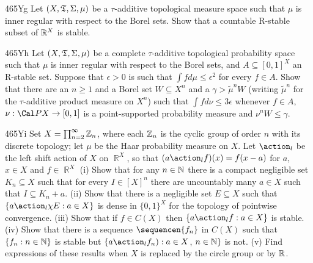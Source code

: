 {\spheader 465Yg Let $(X,\frak T,\Sigma,\mu)$ be a $\tau$-additive
topological measure space such that $\mu$ is inner regular with respect
to the Borel sets.   Show that a countable R-stable subset of $\Bbb R^X$
is stable.

\spheader 465Yh Let $(X,\frak T,\Sigma,\mu)$ be a complete
$\tau$-additive topological probability
space such that $\mu$ is inner regular with respect to the Borel sets,
and $A\subseteq[0,1]^X$ an R-stable set.   Suppose that $\epsilon>0$
is such that $\int fd\mu\le\epsilon^2$ for every $f\in A$.   Show that
there are an $n\ge 1$ and a Borel set $W\subseteq X^n$ and a
$\gamma>\tilde\mu^nW$ (writing $\tilde\mu^n$ for the $\tau$-additive
product measure on $X^n$) such that $\int fd\nu\le 3\epsilon$ whenever
$f\in A$, $\nu:\Cal PX\to[0,1]$ is a point-supported
probability measure and $\nu^nW\le\gamma$.

\spheader 465Yi Set $X=\prod_{n=2}^{\infty}\Bbb Z_n$, where each $\Bbb Z_n$
is the cyclic group of order $n$ with its discrete topology;  let $\mu$ be
the Haar probability measure on $X$.   Let $\action_l$ be the left shift
action of $X$ on $\BbbR^X$, so that
$(a\action_lf)(x)=f(x-a)$ for $a$, $x\in X$ and $f\in\BbbR^X$
(i) Show that for any $n\in\Bbb N$ there is a
compact negligible set $K_n\subseteq X$ such that for every $I\in[X]^n$
there are uncountably many $a\in X$ such that $I\subseteq K_n+a$.   (ii)
Show that there is a negligible set $E\subseteq X$ such that
$\{a\action_l\chi E:a\in X\}$ is dense in $\{0,1\}^X$ for the topology of
pointwise convergence.   (iii) Show that if $f\in C(X)$ then
$\{a\action_lf:a\in X\}$ is stable.   (iv) Show that there is a sequence
$\sequencen{f_n}$ in $C(X)$ such that $\{f_n:n\in\Bbb N\}$ is stable but
$\{a\action_lf_n):a\in X$, $n\in\Bbb N\}$ is not.
(v) Find expressions of these
results when $X$ is replaced by the circle group or by $\Bbb R$.
}%

